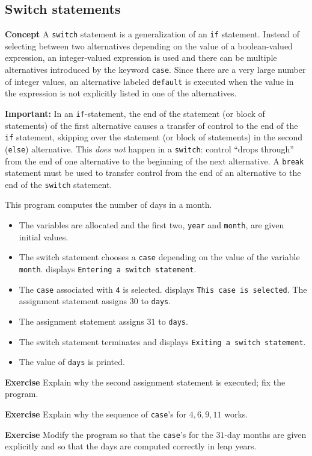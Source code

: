\subsection{Switch statements}\label{control.09}

\textbf{Concept} A \texttt{switch} statement is a generalization of an \texttt{if} statement.
Instead of selecting between two alternatives depending on the value 
of a boolean-valued expression, an integer-valued expression is used and there can be
multiple alternatives introduced by the keyword \texttt{case}.
Since there are a very large number of 
integer values, an alternative labeled \texttt{default} is executed when the
value in the expression is not explicitly listed in one of the alternatives.

\textbf{Important:}
In an \texttt{if}-statement, the end of the statement (or block of statements)
of the first alternative causes a transfer of control 
to the end of the \texttt{if} statement, skipping over the statement (or block
of statements) in the second (\texttt{else}) alternative. This \emph{does not} happen in
a \texttt{switch}: control ``drops through'' from the end of one alternative to the beginning
of the next alternative.
A \texttt{break} statement must be used to transfer control from the end of an alternative
to the end of the \texttt{switch} statement.


This program computes the number of days in a month.
\begin{itemize}
\item The variables are allocated and the first two, \texttt{year} and \texttt{month}, are
given initial values.
\item The switch statement chooses a \texttt{case} depending on the value of the variable
\texttt{month}. \jel{} displays \texttt{Entering a switch statement}.
\item The \texttt{case} associated with \texttt{4} is selected.
\jel{} displays \texttt{This case is selected}.
The assignment statement assigns $30$ to \texttt{days}.
\item The assignment statement assigns $31$ to \texttt{days}.
\item The switch statement terminates and 
\jel{} displays \texttt{Exiting a switch statement}.
\item The value of \texttt{days} is printed.
\end{itemize}

\textbf{Exercise} Explain why the second assignment statement
is executed; fix the program.

\textbf{Exercise} Explain why the sequence of \texttt{case}'s for $4,6,9,11$ works.

\textbf{Exercise} Modify the program so that the \texttt{case}'s for the $31$-day months
are given explicitly and so that the days are computed correctly in leap years.
